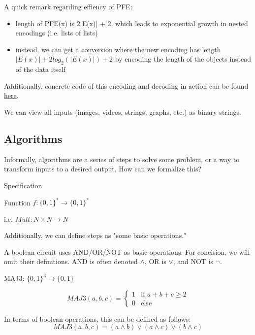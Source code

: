 A quick remark regarding effiency of PFE: 
\begin{itemize}
    \item length of PFE(x) is 2|E(x)| + 2, which leads to exponential growth in nested encodings (i.e. lists of lists)
    \item instead, we can get a conversion where the new encoding has length $|E(x)| + 2log_2(|E(x)|) + 2$ by encoding the length of the objects instead of the data itself
\end{itemize}

Additionally, concrete code of this encoding and decoding in action can be found \href{https://edstem.org/us/courses/28562/workspaces/pUNFGGbgVl0Q4IyBwE0ctDMwIXN0XBdt}{here}.

\vspace{.5cm}

 We can view all inputs (images, videos, strings, graphs, etc.) as binary strings.

\hr

\subsection*{Algorithms}

Informally, algorithms are a series of steps to solve some problem, or a way to transform inputs to a desired output. How can we formalize this?

\begin{definition}
    Specification
    
    Function $f: \{0,1\}^* \rightarrow \{0,1\}^*$
    
    i.e. $Mult: N \times N \rightarrow N$
\end{definition}

Additionally, we can define steps as "some basic operations."

\vspace{.5cm}


A boolean circuit uses AND/OR/NOT as basic operations. For concision, we will omit their definitions. AND is often denoted $\land$, OR is $\lor$, and NOT is $\lnot$.

\begin{example}
    MAJ3: $\{0, 1\}^3 \rightarrow \{0,1\}$

    \begin{equation}
        MAJ3(a, b, c)= 
        \begin{cases}
            1 & \text{if } a + b + c \ge 2 \\
            0 & \text{else}
        \end{cases}
    \end{equation}

    In terms of boolean operations, this can be defined as follows:
    \[
        MAJ3(a,b,c) = (a \land b) \lor (a \land c) \lor (b \land c)
    \]
\end{example}

